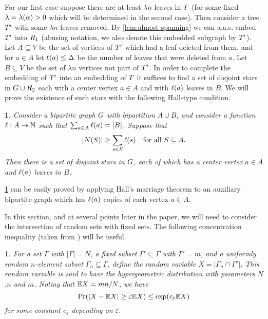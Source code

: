 \documentclass[11pt,english]{article}
\theoremstyle{plain}
\theoremstyle{plain}
\theoremstyle{plain}
\newtheorem{lem}[thm]{\protect\lemmaname}
\theoremstyle{plain}
\theoremstyle{plain}
\theoremstyle{definition}
\theoremstyle{definition}
\theoremstyle{remark}
\theoremstyle{remark}
\theoremstyle{plain}
\theoremstyle{definition}
\theoremstyle{definition}
\theoremstyle{plain}
\theoremstyle{plain}
\theoremstyle{plain}
\newtheorem{mylem}[mythm]{\protect\lemmaname}
\renewenvironment{lem}{\begin{mylem}}{\end{mylem}}
\theoremstyle{plain}
\theoremstyle{remark}
\theoremstyle{plain}
\theoremstyle{definition}
\let\originalleft\left
\let\originalright\right
\renewcommand{\left}{\mathopen{}\mathclose\bgroup\originalleft}
\renewcommand{\right}{\aftergroup\egroup\originalright}
\providecommand{\lemmaname}{Lemma}
\begin{document}
For our first case suppose there are at least $\lambda n$ leaves
in $T$ (for some fixed $\lambda=\lambda\left(\a\right)>0$ which
will be determined in the second case). Then consider a tree $T'$
with some $\lambda n$ leaves removed. By \ref{lem:almost-spanning}
we can a.a.s. embed $T'$ into $R_{1}$ (abusing notation, we also
denote this embedded subgraph by $T'$). Let $A\subseteq V$ be the
set of vertices of $T'$ which had a leaf deleted from them, and
for $a\in A$ let $\ell\left(a\right)\le\Delta$ be the number of
leaves that were deleted from $a$. Let $B\subseteq V$ be the set
of $\lambda n$ vertices not part of $T'$. In order to complete
the embedding of $T'$ into an embedding of $T$ it suffices to
find a set of disjoint stars in $G\cup R_{2}$ each with a center
vertex $a\in A$ and with $\ell\left(a\right)$ leaves in $B$. We
will prove the existence of such stars with the following Hall-type
condition.
\begin{lem}
\label{lem:hall-stars}Consider a bipartite graph $G$ with bipartition
$A\cup B$, and consider a function $\ell:A\to\mathbb{N}$ such that $\sum_{a\in A}\ell\left(a\right)=\left|B\right|$.
Suppose that 
\[
\left|N\left(S\right)\right|\ge\sum_{s\in S}\ell\left(s\right)\quad\mbox{for all }S\subseteq A.
\]
Then there is a set of disjoint stars in $G$, each of which has
a center vertex $a\in A$ and $\ell\left(a\right)$ leaves in $B$.
\end{lem}
\ref{lem:hall-stars} can be easily proved by applying Hall's marriage
theorem to an auxiliary bipartite graph which has $\ell\left(a\right)$
copies of each vertex $a\in A$.

In this section, and at several points later in the paper, we will need to consider the intersection of random sets with fixed sets. The following concentration inequality (taken from \cite[Theorem 2.10]{JLR00}) will be useful.

\begin{lem}\label{lem:hypergeometric-concentration}For a set $\Gamma$ with $|\Gamma|=N$, a fixed subset $\Gamma'\subseteq \Gamma$ with $\Gamma'=m$, and a uniformly random $n$-element subset $\Gamma_n\subseteq \Gamma$, define the random variable $X=|\Gamma_n\cap\Gamma'|$. This random variable is said to have the \emph{hypergeometric distribution} with parameters $N$,$n$ and $m$. Noting that $\mathbb{E} X=mn/N$, we have
\[
\Pr\left(|X-\E X|\ge \varepsilon \E X\right)\le \exp(c_\varepsilon \E X)
\]
for some constant $c_\varepsilon$ depending on $\varepsilon$.
\end{lem}
\end{document}
